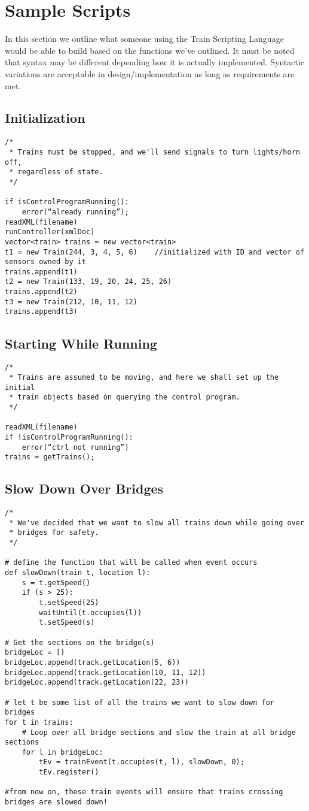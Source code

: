 \documentclass[a4paper,11pt,notitlepage]{article}
\def\TSL{Train Scripting Language\xspace}
\begin{document}
\newpage
\section{Sample Scripts}
In this section we outline what someone using the \TSL would be able to build based on the functions we've outlined. It must be noted that syntax may be different depending how it is actually implemented. Syntactic variations are acceptable in design/implementation as long as requirements are met.

\subsection{Initialization}
\begin{verbatim}
/*
 * Trains must be stopped, and we'll send signals to turn lights/horn off,
 * regardless of state.
 */

if isControlProgramRunning():
    error(“already running”);
readXML(filename)
runController(xmlDoc)
vector<train> trains = new vector<train>
t1 = new Train(244, 3, 4, 5, 6)    //initialized with ID and vector of sensors owned by it
trains.append(t1)
t2 = new Train(133, 19, 20, 24, 25, 26)
trains.append(t2)
t3 = new Train(212, 10, 11, 12)
trains.append(t3)
\end{verbatim}

\subsection{Starting While Running}
\begin{verbatim}
/*
 * Trains are assumed to be moving, and here we shall set up the initial
 * train objects based on querying the control program.
 */

readXML(filename)
if !isControlProgramRunning():
    error(“ctrl not running”)
trains = getTrains();
\end{verbatim}

\subsection{Slow Down Over Bridges}
\begin{verbatim}
/*
 * We've decided that we want to slow all trains down while going over
 * bridges for safety.
 */

# define the function that will be called when event occurs
def slowDown(train t, location l):
    s = t.getSpeed()
	if (s > 25):
		t.setSpeed(25)
		waitUntil(t.occupies(l))
		t.setSpeed(s)

# Get the sections on the bridge(s)
bridgeLoc = []
bridgeLoc.append(track.getLocation(5, 6))
bridgeLoc.append(track.getLocation(10, 11, 12))
bridgeLoc.append(track.getLocation(22, 23))

# let t be some list of all the trains we want to slow down for bridges
for t in trains:
	# Loop over all bridge sections and slow the train at all bridge sections
	for l in bridgeLoc:
		tEv = trainEvent(t.occupies(t, l), slowDown, 0);
		tEv.register()

#from now on, these train events will ensure that trains crossing bridges are slowed down!

\end{verbatim}
\end{document}

